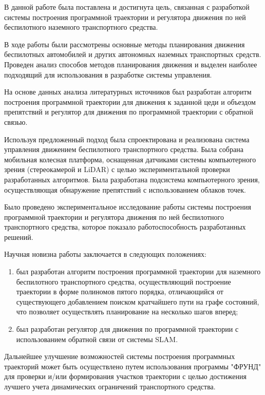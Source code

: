 
В данной работе была поставлена и достигнута цель, связанная с разработкой системы построения программной траектории
и регулятора движения по ней беспилотного наземного транспортного средства.

В ходе работы были рассмотрены основные методы планирования движения беспилотных автомобилей и других автономных
наземных транспортных средств. Проведен анализ способов методов планирования движения и выделен наиболее подходящий
для использования в разработке системы управления.

На основе данных анализа литературных источников был разработан алгоритм построения программной траектории для
движения к заданной цеди и объездом препятствий и регулятор для движения по программной траектории с обратной связью.

Используя предложенный подход была спроектирована и реализована система управления движением беспилотного транспортного
средства. Была собрана мобильная колесная платформа, оснащенная датчиками  системы компьютерного зрения
(стереокамерой и LiDAR) с целью экспериментальной проверки разработанных алгоритмов. Была разработана подсистема
компьютерного зрения, осуществляющая обнаружение препятствий с использованием облаков точек.

Было проведено экспериментальное исследование работы системы построения программной траектории и регулятора движения
по ней беспилотного транспортного средства, которое показало работоспособность разработанных решений.

Научная новизна работы заключается в следующих положениях:
\begin{enumerate}
    \item был разработан алгоритм построения программной траектории для наземного беспилотного транспортного
          средства, осуществляющий построение траектории в форме полиномов пятого порядка, отличающийся от существующего
          добавлением поиском кратчайшего пути на графе состояний, что позволяет осуществлять планирование на несколько
          шагов вперед;
    \item был разработан регулятор для движения по программной траектории с использованием обратной связи
          от системы SLAM.
\end{enumerate}

Дальнейшее улучшение возможностей системы построения программных траекторий может быть осуществлено путем использования
программы "ФРУНД" для проверки и/или формирования участков траектории с целью достижения лучшего учета динамических
ограничений транспортного средства.